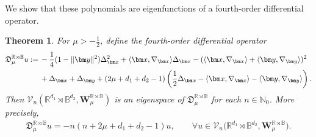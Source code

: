 \documentclass{amsart}
\newtheorem{thm}{Theorem}[section]
\theoremstyle{remark}
\def\la{{\langle}}
\def\ra{{\rangle}}
\def\fD{{\mathfrak D}}
\def\a{{\alpha}}
\def\la{{\langle}}
\def\ra{{\rangle}}
\def\xb{{\bm x}}
\def\yb{{\bm y}}
\def\CV{{\mathcal V}}
\def\BB{{\mathbb B}}
\def\NN{{\mathbb N}}
\def\RR{{\mathbb R}}
\def\bk{{\boldsymbol{\kappa}}}
\def\f{\frac}
\begin{document}
We show that these polynomials are eigenfunctions of a fourth-order differential operator. 


\begin{thm}\label{thm:RB}
For $\mu > -\f12$, define the fourth-order differential operator 
\begin{align} \label{eq:RB}
  \fD_{\mu}^{\RR \rtimes \BB} u: = \,& -\frac14 (1-\|\yb\|^2) \Delta_{\xb}^2 + \la \xb,\nabla_\xb\ra \Delta_\xb - (\la \xb,\nabla_\xb\ra 
   + \la \yb,\nabla_\yb\ra) ^2  \\
   & + \Delta_\xb + \Delta_\yb %
   +  (2\mu + d_1+d_2 -1) \left( \f12 \Delta_\xb- \la \xb,\nabla_\xb\ra - \la \yb,\nabla_\yb\ra \right). \notag
\end{align}
Then $\CV_n(\RR^{d_1}  \rtimes \BB^{d_2}, \bm W_{\mu}^{\RR \rtimes \BB})$ is an eigenspace 
of $ \fD_{\mu}^{\RR \rtimes \BB}$ for each $n \in \NN_0$. More precisely, 
\begin{align} \label{eq:RB-eigen}
  \fD_{\mu}^{\RR \rtimes \BB} u =  - n (n+ 2\mu + d_1+d_2 - 1) u, \qquad 
         \forall u \in \CV_n\big(\RR^{d_1}  \rtimes \BB^{d_2}, \bm W_{\mu}^{\RR \rtimes \BB}\big).
\end{align}
\end{thm}
\end{document}
